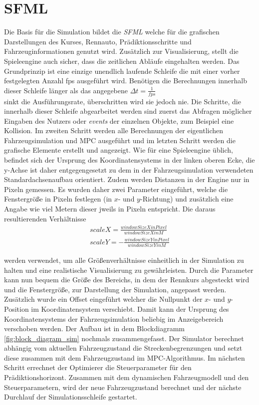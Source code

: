 \documentclass{like}
\begin{document}
\section{\acl{SFML}}
Die Basis für die Simulation bildet die \emph{ \ac{SFML}} welche für die grafischen Darstellungen des Kurses, Rennauto, Prädiktionsschritte und Fahrzeuginformationen genutzt wird. Zusätzlich zur Visualisierung, stellt die Spieleengine auch sicher, dass die zeitlichen Abläufe eingehalten werden. Das Grundprinzip ist eine einzige unendlich laufende Schleife die mit einer vorher festgelegten Anzahl \ac{fps} ausgeführt wird. Benötigen die Berechnungen innerhalb dieser Schleife länger als das angegebene
$\Delta t = \frac{1}{fps}$ \\
sinkt die Ausführungsrate, überschritten wird sie jedoch nie. Die Schritte, die innerhalb dieser Schleife abgearbeitet werden sind zuerst das Abfragen möglicher Eingaben des Nutzers oder \emph{events} der einzelnen Objekte, zum Beispiel eine Kollision. Im zweiten Schritt werden alle Berechnungen der eigentlichen Fahrzeugsimulation und \ac{MPC} ausgeführt und im letzten Schritt werden die grafische Elemente erstellt und angezeigt. Wie für eine Spieleengine üblich, befindet sich der Ursprung des Koordinatensystems in der linken oberen Ecke, die y-Achse ist daher entgegengesetzt zu dem in der Fahrzeugsimulation verwendeten Standardachsenaufbau orientiert. Zudem werden Distanzen in der Engine nur in Pixeln gemessen. Es wurden daher zwei Parameter eingeführt, welche die Fenstergröße in Pixeln festlegen (in \(x\)- und  \(y\)-Richtung)
und zusätzlich eine Angabe wie viel Metern dieser jweils in Pixeln entspricht. Die daraus resultierenden Verhältnisse \\
\begin{eqnarray}
	scaleX = \frac{windowSizeXinPixel}{windowSizeXinM} \\
	scaleY = - \frac{windowSizeYinPixel}{windowSizeYinM} 
\end{eqnarray}

werden verwendet, um alle Größenverhältnisse einheitlich in der Simulation zu halten und eine realistische Visualisierung zu gewährleisten. Durch die Parameter kann nun bequem die Größe des Bereichs, in dem der Rennkurs abgesteckt wird und die Fenstergröße, zur Darstellung der Simulation, angepasst werden. Zusätzlich wurde ein Offset eingeführt welcher die Nullpunkt der \(x\)- und \(y\)- Position im Koordinatensystem verschiebt. Damit kann der Ursprung des Koordinatensystems der Fahrzeugsimulation beliebig im Anzeigebereich verschoben werden. 
Der Aufbau ist in dem Blockdiagramm \ref{fig:block_diagram_sim} nochmals zusammengefasst. Der Simulator berechnet abhängig vom aktuellen Fahrzeugzustand die Streckenbegrenzungen und setzt diese zusammen mit dem Fahrzeugzustand im \ac{MPC}-Algorithmus. Im nächsten Schritt errechnet der Optimierer die Steuerparameter für den Prädiktionshorizont. Zusammen mit dem dynamischen Fahrzeugmodell und den Steuerparametern, wird der neue Fahrzeugzustand berechnet und der nächste Durchlauf der Simulationsschleife gestartet.
\end{document}
